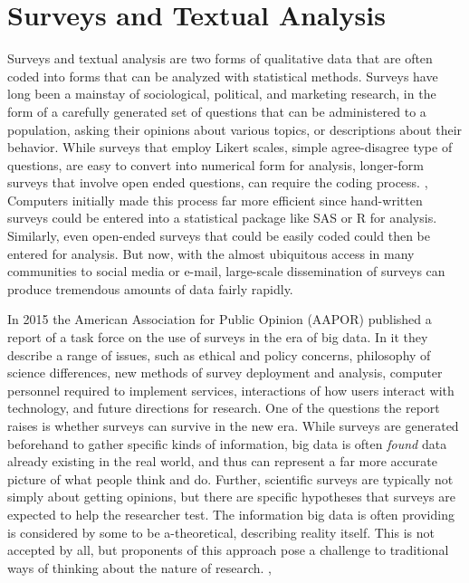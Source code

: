 \documentclass[sigconf]{acmart}
\begin{document}
\section{Surveys and Textual Analysis}
Surveys and textual analysis are two forms of qualitative data that are often coded into forms that can be analyzed with statistical methods.  Surveys have long been a mainstay of sociological, political, and marketing research, in the form of a carefully generated set of questions that can be administered to a population, asking their opinions about various topics, or descriptions about their behavior.  While surveys that employ Likert scales, simple agree-disagree type of questions, are easy to convert into numerical form for analysis, longer-form surveys that involve open ended questions, can require the coding process. \cite{bryman16}, \cite{lazer17} Computers initially made this process far more efficient since hand-written surveys could be entered into a statistical package like SAS or R for analysis.  Similarly, even open-ended surveys that could be easily coded could then be entered for analysis.  But now, with the almost ubiquitous access in many communities to social media or e-mail, large-scale dissemination of surveys can produce tremendous amounts of data fairly rapidly. \cite{couper17}

In 2015 the American Association for Public Opinion (AAPOR) published a report of a task force on the use of surveys in the era of big data. \cite{japec15}  In it they describe a range of issues, such as ethical and policy concerns, philosophy of science differences, new methods of survey deployment and analysis, computer personnel required to implement services, interactions of how users interact with technology, and future directions for research.  One of the questions the report raises is whether surveys can survive in the new era.  While surveys are generated beforehand to gather specific kinds of information, big data is often {\em found} data already existing in the real world, and thus can represent a far more accurate picture of what people think and do.  Further, scientific surveys are typically not simply about getting opinions, but there are specific hypotheses that surveys are expected to help the researcher test.  The information big data is often providing is considered by some to be a-theoretical, describing reality itself.  This is not accepted by all, but proponents of this approach pose a challenge to traditional ways of thinking about the nature of research. \cite{japec15}, \cite{couper17}
\end{document}

